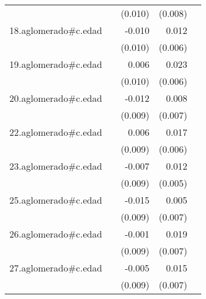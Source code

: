 {\begin{longtable}{l*{4}{D{.}{.}{-1}}}
            &                     &     (0.010)         &     (0.008)         &                     \\
\addlinespace
18.aglomerado#c.edad&                     &      -0.010         &       0.012         &                     \\
            &                     &     (0.010)         &     (0.006)         &                     \\
\addlinespace
19.aglomerado#c.edad&                     &       0.006         &       0.023\sym{***}&                     \\
            &                     &     (0.010)         &     (0.006)         &                     \\
\addlinespace
20.aglomerado#c.edad&                     &      -0.012         &       0.008         &                     \\
            &                     &     (0.009)         &     (0.007)         &                     \\
\addlinespace
22.aglomerado#c.edad&                     &       0.006         &       0.017\sym{**} &                     \\
            &                     &     (0.009)         &     (0.006)         &                     \\
\addlinespace
23.aglomerado#c.edad&                     &      -0.007         &       0.012\sym{*}  &                     \\
            &                     &     (0.009)         &     (0.005)         &                     \\
\addlinespace
25.aglomerado#c.edad&                     &      -0.015         &       0.005         &                     \\
            &                     &     (0.009)         &     (0.007)         &                     \\
\addlinespace
26.aglomerado#c.edad&                     &      -0.001         &       0.019\sym{**} &                     \\
            &                     &     (0.009)         &     (0.007)         &                     \\
\addlinespace
27.aglomerado#c.edad&                     &      -0.005         &       0.015\sym{*}  &                     \\
            &                     &     (0.009)         &     (0.007)         &                     \\

\end{longtable}}
